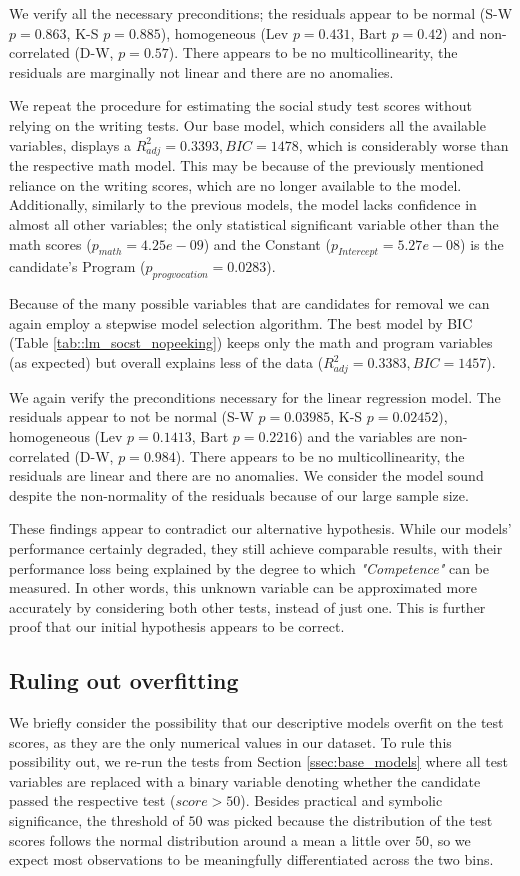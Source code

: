 \documentclass[10pt, a4paper]{article}
\begin{document}
	We verify all the necessary preconditions; the residuals appear to be normal (S-W $p = 0.863$, K-S $p=0.885$), homogeneous (Lev $p = 0.431$, Bart $p = 0.42$) and non-correlated (D-W, $p=0.57$). There appears to be no multicollinearity, the residuals are marginally not linear and there are no anomalies.
	
	We repeat the procedure for estimating the social study test scores without relying on the writing tests. Our base model, which considers all the available variables, displays a $R^2_{adj} = 0.3393, BIC=1478$, which is considerably worse than the respective math model. This may be because of the previously mentioned reliance on the writing scores, which are no longer available to the model. Additionally, similarly to the previous models, the model lacks confidence in almost all other variables; the only statistical significant variable other than the math scores ($p_{math} = 4.25e-09$) and the Constant ($p_{Intercept} = 5.27e-08$) is the candidate's Program ($p_{progvocation} = 0.0283$).
	
	Because of the many possible variables that are candidates for removal we can again employ a stepwise model selection algorithm. The best model by BIC (Table \ref{tab::lm_socst_nopeeking}) keeps only the math and program variables (as expected) but overall explains less of the data ($R^2_{adj} = 0.3383, BIC=1457$).
	
	We again verify the preconditions necessary for the linear regression model. The residuals appear to not be normal (S-W $p = 0.03985$, K-S $p=0.02452$), homogeneous (Lev $p = 0.1413$, Bart $p = 0.2216$) and the variables are non-correlated (D-W, $p=0.984$). There appears to be no multicollinearity, the residuals are linear and there are no anomalies. We consider the model sound despite the non-normality of the residuals because of our large sample size.
	
	These findings appear to contradict our alternative hypothesis. While our models' performance certainly degraded, they still achieve comparable results, with their performance loss being explained by the degree to which \textit{"Competence"} can be measured. In other words, this unknown variable can be approximated more accurately by considering both other tests, instead of just one. This is further proof that our initial hypothesis appears to be correct.
	
	\subsection{Ruling out overfitting}
	We briefly consider the possibility that our descriptive models overfit on the test scores, as they are the only numerical values in our dataset. To rule this possibility out, we re-run the tests from Section \ref{ssec:base_models} where all test variables are replaced with a binary variable denoting whether the candidate passed the respective test ($score>50$). Besides practical and symbolic significance, the threshold of $50$ was picked because the distribution of the test scores follows the normal distribution around a mean a little over $50$, so we expect most observations to be meaningfully differentiated across the two bins.
	
\end{document}
